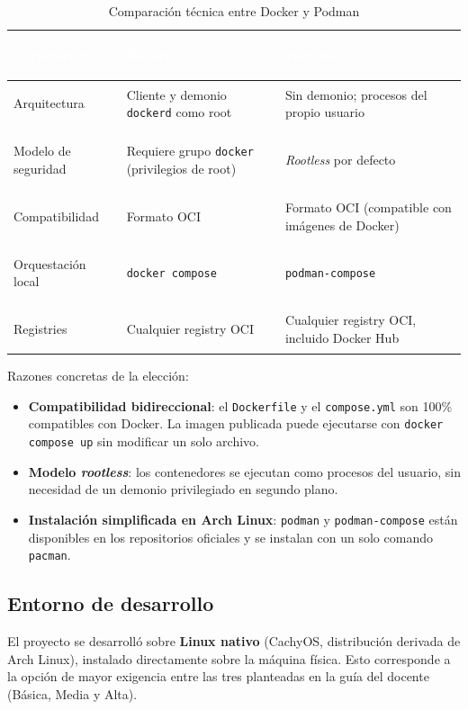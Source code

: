 \documentclass[12pt,a4paper]{article}
\begin{document}
\begin{table}[H]
\centering
\renewcommand{\arraystretch}{1.4}
\begin{tabularx}{\textwidth}{|>{\bfseries\raggedright\arraybackslash}p{3.3cm}|>{\raggedright\arraybackslash}X|>{\raggedright\arraybackslash}X|}
\hline
\rowcolor[RGB]{25,55,109}
\textcolor{white}{\textbf{Característica}} & \textcolor{white}{\textbf{Docker}} & \textcolor{white}{\textbf{Podman}} \\
\hline
Arquitectura & Cliente y demonio \texttt{dockerd} como root & Sin demonio; procesos del propio usuario \\
\hline
Modelo de seguridad & Requiere grupo \texttt{docker} (privilegios de root) & \textit{Rootless} por defecto \\
\hline
Compatibilidad & Formato OCI & Formato OCI (compatible con imágenes de Docker) \\
\hline
Orquestación local & \texttt{docker compose} & \texttt{podman-compose} \\
\hline
Registries & Cualquier registry OCI & Cualquier registry OCI, incluido Docker Hub \\
\hline
\end{tabularx}
\caption{Comparación técnica entre Docker y Podman}
\end{table}

Razones concretas de la elección:

\begin{itemize}
    \item \textbf{Compatibilidad bidireccional}: el \texttt{Dockerfile} y el \texttt{compose.yml} son 100\% compatibles con Docker. La imagen publicada puede ejecutarse con \texttt{docker compose up} sin modificar un solo archivo.
    \item \textbf{Modelo \textit{rootless}}: los contenedores se ejecutan como procesos del usuario, sin necesidad de un demonio privilegiado en segundo plano.
    \item \textbf{Instalación simplificada en Arch Linux}: \texttt{podman} y \texttt{podman-compose} están disponibles en los repositorios oficiales y se instalan con un solo comando \texttt{pacman}.
\end{itemize}

\subsection{Entorno de desarrollo}

El proyecto se desarrolló sobre \textbf{Linux nativo} (CachyOS, distribución derivada de Arch Linux), instalado directamente sobre la máquina física. Esto corresponde a la opción de mayor exigencia entre las tres planteadas en la guía del docente (Básica, Media y Alta).
\end{document}
